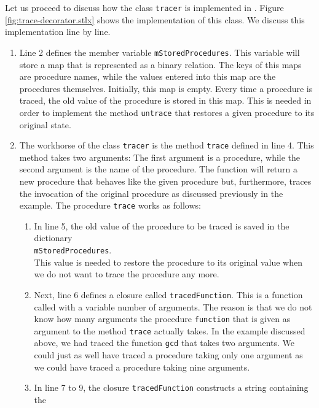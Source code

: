 Let us proceed to discuss how the class \texttt{tracer} is implemented in \setlx.  Figure
\ref{fig:trace-decorator.stlx} shows the implementation of this class.  We discuss this
implementation line by line.
\begin{enumerate}
\item Line 2 defines the member variable \texttt{mStoredProcedures}.  This variable will store a map
      that is represented as a binary relation.  The keys of this maps are procedure names, while the
      values entered into this map are the procedures themselves.  Initially, this map is empty.  Every time a
      procedure is traced, the old value of the procedure is stored in this map.  This is needed in
      order to implement the method \texttt{untrace} that restores a given procedure to its original
      state.
\item The workhorse of the class \texttt{tracer} is the method \texttt{trace} defined in line 4.
      This method takes two arguments:  The first argument is a procedure, while the second argument
      is the name of the procedure.  The function will return a new procedure that behaves like the
      given procedure but, furthermore, traces the invocation of the original procedure as discussed
      previously in the example.  The procedure \texttt{trace} works as follows:
      \begin{enumerate}
      \item In line 5, the old value of the procedure to be traced is saved in the dictionary 
            \\[0.2cm]
            \hspace*{1.3cm}
            \texttt{mStoredProcedures}.
            \\[0.2cm]
            This value is needed to restore the procedure to its original value when we do not want
            to trace the procedure any more.
      \item Next, line 6 defines a closure called \texttt{tracedFunction}.  This is a function    
            called with a variable number of arguments.  The reason is that we do
            not know how many 
            arguments the procedure \texttt{function} that is given as argument to the method
            \texttt{trace} actually takes.  In the example discussed above, we had traced the
            function \texttt{gcd} that takes two arguments.  We could just as well have traced a
            procedure taking only one argument as we could have traced a procedure taking nine
            arguments.
      \item In line 7 to 9, the closure \texttt{tracedFunction} constructs a string containing the

\end{enumerate}
\end{enumerate}
